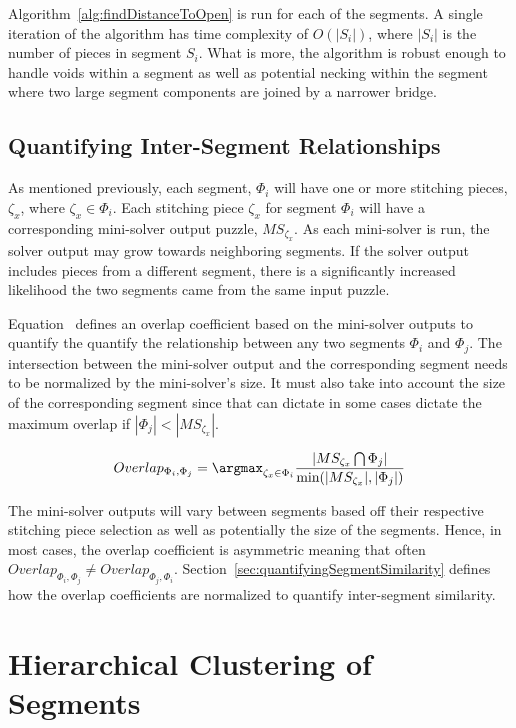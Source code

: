 Algorithm~\ref{alg:findDistanceToOpen} is run for each of the segments.  A single iteration of the algorithm has time complexity of $O(|S_i|)$, where $|S_i|$ is the number of pieces in segment $S_i$.  What is more, the algorithm is robust enough to handle voids within a segment as well as potential necking within the segment where two large segment components are joined by a narrower bridge.


\subsection{Quantifying Inter-Segment Relationships}

As mentioned previously, each segment, $\Phi_i$ will have one or more stitching pieces, $\zeta_x$, where $\zeta_x \in \Phi_i$.  Each stitching piece $\zeta_x$ for segment $\Phi_i$ will have a corresponding mini-solver output puzzle, $MS_{\zeta_x}$.  As each mini-solver is run, the solver output may grow towards neighboring segments.  If the solver output includes pieces from a different segment, there is a significantly increased likelihood the two segments came from the same input puzzle. 

Equation~ defines an overlap coefficient based on the mini-solver outputs to quantify the quantify the relationship between any two segments $\Phi_i$ and $\Phi_j$. The intersection between the mini-solver output and the corresponding segment needs to be normalized by the mini-solver's size.  It must also take into account the size of the corresponding segment since that can dictate in some cases dictate the maximum overlap if $|\Phi_j| < |MS_{\zeta_x}|$.

\begin{equation} \label{eq:segmentOverlap}
Overlap_{\Phi_i,\Phi_j} = \argmax_{\zeta_x \in \Phi_i} {\frac{|MS_{\zeta_x} \bigcap \Phi_j|}{\text{min}(|MS_{\zeta_x}|, |\Phi_j|)}}
\end{equation}

The mini-solver outputs will vary between segments based off their respective stitching piece selection as well as potentially the size of the segments.  Hence, in most cases, the overlap coefficient is asymmetric meaning that often $Overlap_{\Phi_i,\Phi_j} \neq Overlap_{\Phi_j,\Phi_i}$.  Section~\ref{sec:quantifyingSegmentSimilarity} defines how the overlap coefficients are normalized to quantify inter-segment similarity.

\section{Hierarchical Clustering of Segments}\label{{sec:hierarchicalClustering}}

